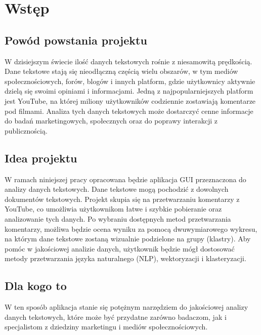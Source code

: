 \chapter*{Wstęp}
\section{Powód powstania projektu}
W dzisiejszym świecie ilość danych tekstowych rośnie z niesamowitą prędkością. Dane tekstowe stają się nieodłączną częścią wielu obszarów, w tym mediów społecznościowych, forów, blogów i innych platform, gdzie użytkownicy aktywnie dzielą się swoimi opiniami i informacjami. Jedną z najpopularniejszych platform jest YouTube, na której miliony użytkowników codziennie zostawiają komentarze pod filmami. Analiza tych danych tekstowych może dostarczyć cenne informacje do badań marketingowych, społecznych oraz do poprawy interakcji z publicznością.

\section{Idea projektu}
W ramach niniejszej pracy opracowana będzie aplikacja GUI przeznaczona do analizy danych tekstowych. Dane tekstowe mogą pochodzić z dowolnych dokumentów tekstowych. Projekt skupia się na przetwarzaniu komentarzy z YouTube, co umożliwia użytkownikom łatwe i szybkie pobieranie oraz analizowanie tych danych. Po wybraniu dostępnych metod przetwarzania komentarzy, możliwa będzie ocena wyniku za pomocą dwuwymiarowego wykresu, na którym dane tekstowe zostaną wizualnie podzielone na grupy (klastry). Aby pomóc w jakościowej analizie danych, użytkownik będzie mógł dostosować metody przetwarzania języka naturalnego (NLP), wektoryzacji i klasteryzacji.

\section{Dla kogo to}
W ten sposób aplikacja stanie się potężnym narzędziem do jakościowej analizy danych tekstowych, które może być przydatne zarówno badaczom, jak i specjalistom z dziedziny marketingu i mediów społecznościowych.

